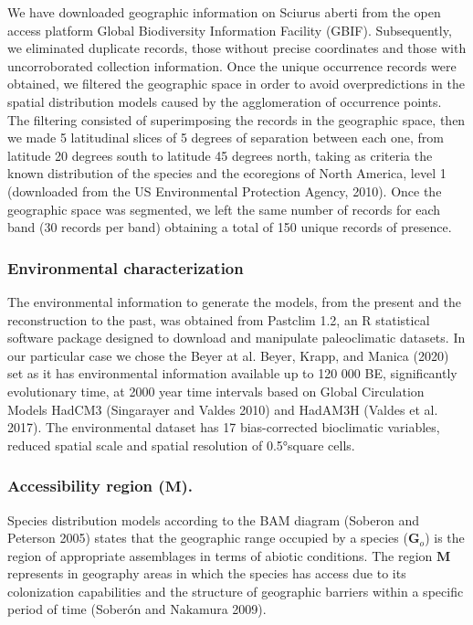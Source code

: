 \documentclass[
]{article}
\begin{document}
We have downloaded geographic information on Sciurus aberti from the
open access platform Global Biodiversity Information Facility (GBIF).
Subsequently, we eliminated duplicate records, those without precise
coordinates and those with uncorroborated collection information. Once
the unique occurrence records were obtained, we filtered the geographic
space in order to avoid overpredictions in the spatial distribution
models caused by the agglomeration of occurrence points. The filtering
consisted of superimposing the records in the geographic space, then we
made 5 latitudinal slices of 5 degrees of separation between each one,
from latitude 20 degrees south to latitude 45 degrees north, taking as
criteria the known distribution of the species and the ecoregions of
North America, level 1 (downloaded from the US Environmental Protection
Agency, 2010). Once the geographic space was segmented, we left the same
number of records for each band (30 records per band) obtaining a total
of 150 unique records of presence.

\hypertarget{environmental-characterization}{%
\subsubsection{Environmental
characterization}\label{environmental-characterization}}

The environmental information to generate the models, from the present
and the reconstruction to the past, was obtained from Pastclim 1.2, an R
statistical software package designed to download and manipulate
paleoclimatic datasets. In our particular case we chose the Beyer at al.
Beyer, Krapp, and Manica (2020) set as it has environmental information
available up to 120 000 BE, significantly evolutionary time, at 2000
year time intervals based on Global Circulation Models HadCM3
(Singarayer and Valdes 2010) and HadAM3H (Valdes et al. 2017). The
environmental dataset has 17 bias-corrected bioclimatic variables,
reduced spatial scale and spatial resolution of 0.5°square cells.

\hypertarget{accessibility-region-textbfm.}{%
\subsubsection{\texorpdfstring{Accessibility region
(\(\textbf{M}\)).}{Accessibility region (\textbackslash textbf\{M\}).}}\label{accessibility-region-textbfm.}}

Species distribution models according to the BAM diagram (Soberon and
Peterson 2005) states that the geographic range occupied by a species
(\(\textbf{G}_o\)) is the region of appropriate assemblages in terms of
abiotic conditions. The region \(\textbf{M}\) represents in geography
areas in which the species has access due to its colonization
capabilities and the structure of geographic barriers within a specific
period of time (Soberón and Nakamura 2009).
\end{document}
